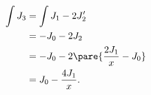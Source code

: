 \documentclass[hidelinks]{ctexart}
\begin{document}
\begin{align*}
    \int J_3 &= \int J_1 - 2J'_2 \\
    &= -J_0 - 2J_2 \\
    &= -J_0 - 2\pare{\frac{2J_1}{x} - J_0} \\
    &= J_0 - \frac{4J_1}{x}.
\end{align*}
\end{document}
